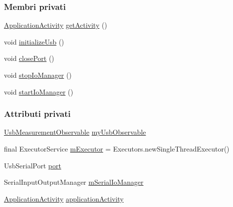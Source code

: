 \subsubsection*{Membri privati}
\begin{DoxyCompactItemize}
\item 
\hyperlink{classit_1_1unibo_1_1torsello_1_1bluetoothpositioning_1_1activities_1_1ApplicationActivity}{Application\+Activity} \hyperlink{classit_1_1unibo_1_1torsello_1_1bluetoothpositioning_1_1util_1_1UsbUtil_a625b1885830a4d2c359a534834a46648_a625b1885830a4d2c359a534834a46648}{get\+Activity} ()
\item 
void \hyperlink{classit_1_1unibo_1_1torsello_1_1bluetoothpositioning_1_1util_1_1UsbUtil_a12b05cc1420c35ea8072d16253ab362e_a12b05cc1420c35ea8072d16253ab362e}{initialize\+Usb} ()
\item 
void \hyperlink{classit_1_1unibo_1_1torsello_1_1bluetoothpositioning_1_1util_1_1UsbUtil_acfc389f97d1eae6eabe803bf16b49f7d_acfc389f97d1eae6eabe803bf16b49f7d}{close\+Port} ()
\item 
void \hyperlink{classit_1_1unibo_1_1torsello_1_1bluetoothpositioning_1_1util_1_1UsbUtil_ae33eeba2e0dc8e8a40b83afea3ff8542_ae33eeba2e0dc8e8a40b83afea3ff8542}{stop\+Io\+Manager} ()
\item 
void \hyperlink{classit_1_1unibo_1_1torsello_1_1bluetoothpositioning_1_1util_1_1UsbUtil_ae6dea43af2962f682be4e87b11699c00_ae6dea43af2962f682be4e87b11699c00}{start\+Io\+Manager} ()
\end{DoxyCompactItemize}
\subsubsection*{Attributi privati}
\begin{DoxyCompactItemize}
\item 
\hyperlink{classit_1_1unibo_1_1torsello_1_1bluetoothpositioning_1_1observables_1_1UsbMeasurementObservable}{Usb\+Measurement\+Observable} \hyperlink{classit_1_1unibo_1_1torsello_1_1bluetoothpositioning_1_1util_1_1UsbUtil_a1c500d0f1a3f3a11b16015acc49929e0_a1c500d0f1a3f3a11b16015acc49929e0}{my\+Usb\+Observable}
\item 
final Executor\+Service \hyperlink{classit_1_1unibo_1_1torsello_1_1bluetoothpositioning_1_1util_1_1UsbUtil_a0b5ea6576e2234b8f7a43343b598d637_a0b5ea6576e2234b8f7a43343b598d637}{m\+Executor} = Executors.\+new\+Single\+Thread\+Executor()
\item 
Usb\+Serial\+Port \hyperlink{classit_1_1unibo_1_1torsello_1_1bluetoothpositioning_1_1util_1_1UsbUtil_a49aef08510b6d48d627670d834099c36_a49aef08510b6d48d627670d834099c36}{port}
\item 
Serial\+Input\+Output\+Manager \hyperlink{classit_1_1unibo_1_1torsello_1_1bluetoothpositioning_1_1util_1_1UsbUtil_aba070ed30c34ed6fd900b30452817b4b_aba070ed30c34ed6fd900b30452817b4b}{m\+Serial\+Io\+Manager}
\item 
\hyperlink{classit_1_1unibo_1_1torsello_1_1bluetoothpositioning_1_1activities_1_1ApplicationActivity}{Application\+Activity} \hyperlink{classit_1_1unibo_1_1torsello_1_1bluetoothpositioning_1_1util_1_1UsbUtil_afdcd78c04f043fafe29eb2cc006b5843_afdcd78c04f043fafe29eb2cc006b5843}{application\+Activity}
\end{DoxyCompactItemize}


